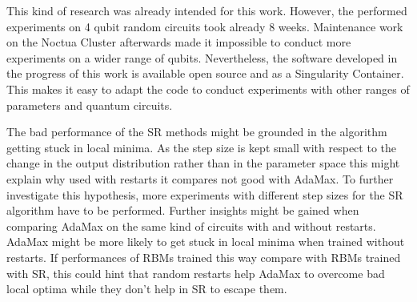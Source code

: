 This kind of research was already intended for this work. However, the performed experiments 
on 4 qubit random circuits took already 8 weeks. Maintenance work on the Noctua Cluster 
afterwards made it impossible to conduct more experiments on a wider range of qubits.
Nevertheless, the software developed in the progress of this work is available open source 
and as a Singularity Container. This makes it easy to adapt the code to conduct experiments 
with other ranges of parameters and quantum circuits.

The bad performance of the SR methods might be grounded in the algorithm getting stuck in 
local minima. As the step size is kept small with respect to the change in the output distribution
rather than in the parameter space this might explain why used with restarts it compares 
not good with AdaMax. To further investigate this hypothesis, more experiments with different step 
sizes for the SR algorithm have to be performed. Further insights might be gained when comparing 
AdaMax on the same kind of circuits with and without restarts. AdaMax might be more likely to 
get stuck in local minima when trained without restarts. If performances of RBMs trained this way 
compare with RBMs trained with SR, this could hint that random restarts help AdaMax to overcome
bad local optima while they don't help in SR to escape them.

